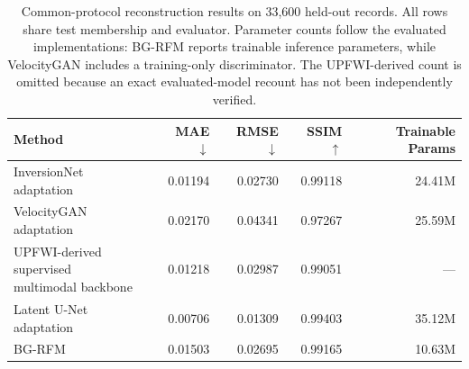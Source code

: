 \begin{table}[t]
\centering
\small
\setlength{\tabcolsep}{4.5pt}
\caption{Common-protocol reconstruction results on 33,600 held-out records. All rows share test membership and evaluator. Parameter counts follow the evaluated implementations: BG-RFM reports trainable inference parameters, while VelocityGAN includes a training-only discriminator. The UPFWI-derived count is omitted because an exact evaluated-model recount has not been independently verified.}
\label{tab:rs-main}
\begin{tabular}{lrrrr}
\toprule
Method & MAE $\downarrow$ & RMSE $\downarrow$ & SSIM $\uparrow$ & Trainable Params \\
\midrule
InversionNet adaptation & 0.01194 & 0.02730 & 0.99118 & 24.41M \\
VelocityGAN adaptation & 0.02170 & 0.04341 & 0.97267 & 25.59M \\
\shortstack[l]{UPFWI-derived supervised\\multimodal backbone} & 0.01218 & 0.02987 & 0.99051 & --- \\
Latent U-Net adaptation & 0.00706 & 0.01309 & 0.99403 & 35.12M \\
BG-RFM & 0.01503 & 0.02695 & 0.99165 & 10.63M \\
\bottomrule
\end{tabular}
\end{table}
